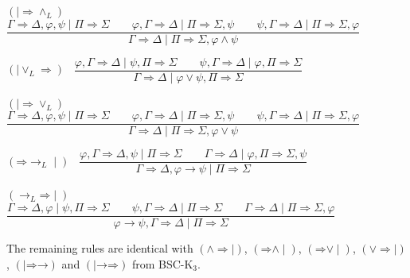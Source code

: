 \documentclass[10pt,a4paper]{article}
\theoremstyle{definition}
\newcommand{\3}{\vspace{.3in}}
\newcommand{\2}{\vspace{.2in}}
\newcommand{\1}{\vspace{.1in}}
\newcommand{\5}{\vspace{.05in}}
\begin{document}
\begin{flushleft}
	{\footnotesize $(\mid\mathord{\Rightarrow\wedge_L})$ \ $ \dfrac{\Gamma
			\Rightarrow \Delta, \varphi, \psi \mid \Pi\Rightarrow\Sigma \qquad\varphi, \Gamma\Rightarrow\Delta \mid
			\Pi \Rightarrow \Sigma, \psi \qquad \psi, \Gamma\Rightarrow\Delta \mid \Pi\Rightarrow\Sigma, \varphi } {\Gamma
			\Rightarrow \Delta\mid \Pi\Rightarrow\Sigma, \varphi\wedge\psi }$}
\end{flushleft}

\begin{flushleft}
	$(\mathord{\mid\vee_L\Rightarrow})$ \ $\dfrac{\varphi, \Gamma
		\Rightarrow \Delta \mid \psi, \Pi\Rightarrow\Sigma \qquad \psi, \Gamma\Rightarrow\Delta\mid \varphi, \Pi\Rightarrow\Sigma}{\Gamma\Rightarrow\Delta \mid \varphi\vee\psi, \Pi\Rightarrow\Sigma}$
\end{flushleft} 

\begin{flushleft}
	{\footnotesize $(\mathord{\mid\Rightarrow\vee_L})$ \ $\dfrac{\Gamma
			\Rightarrow \Delta, \varphi, \psi \mid \Pi\Rightarrow\Sigma \qquad\varphi,  \Gamma\Rightarrow\Delta \mid
			\Pi \Rightarrow \Sigma, \psi \qquad \psi, \Gamma\Rightarrow\Delta \mid \Pi\Rightarrow\Sigma, \varphi } {\Gamma
			\Rightarrow \Delta \mid \Pi\Rightarrow\Sigma, \varphi\vee\psi}$}
\end{flushleft}

\begin{flushleft}
	$(\mathord{\Rightarrow}\mathord{\rightarrow_L}\mid)$ \ $\dfrac{\varphi, \Gamma
		\Rightarrow \Delta, \psi \mid \Pi\Rightarrow\Sigma \qquad \Gamma\Rightarrow\Delta \mid \varphi, \Pi\Rightarrow\Sigma, \psi}{\Gamma\Rightarrow\Delta, \varphi\rightarrow\psi \mid \Pi\Rightarrow\Sigma}$ 
\end{flushleft}

\begin{flushleft}
	{\small $(\mathord{\rightarrow_L}\mathord{\Rightarrow}\mid)$ \ $\dfrac{\Gamma
			\Rightarrow \Delta, \varphi \mid \psi, \Pi\Rightarrow\Sigma \qquad \psi, \Gamma\Rightarrow\Delta \mid
			\Pi \Rightarrow \Sigma \qquad \Gamma\Rightarrow\Delta \mid \Pi\Rightarrow\Sigma, \varphi } {\varphi\rightarrow\psi, \Gamma
			\Rightarrow \Delta \mid \Pi\Rightarrow\Sigma}$}
\end{flushleft}

The remaining  rules are identical with  $(\mathord{\wedge}\mathord{\Rightarrow\mid})$, $(\mathord{\Rightarrow}\mathord{\wedge\mid})$, $(\mathord{\Rightarrow}\mathord{\vee\mid})$, $(\mathord{\vee}\mathord{\Rightarrow\mid})$, $(\mid\mathord{\Rightarrow}\mathord{\rightarrow})$ and $(\mid\mathord{\rightarrow}\mathord{\Rightarrow})$ from BSC-K$_3$.
\end{document}
